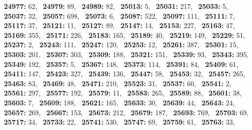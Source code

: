 \textbf{24977:} 62,\allowbreak~ 
\textbf{24979:} 89,\allowbreak~ 
\textbf{24989:} 82,\allowbreak~ 
\textbf{25013:} 5,\allowbreak~ 
\textbf{25031:} 217,\allowbreak~ 
\textbf{25033:} 5,\allowbreak~ 
\textbf{25037:} 32,\allowbreak~ 
\textbf{25057:} 698,\allowbreak~ 
\textbf{25073:} 6,\allowbreak~ 
\textbf{25087:} 522,\allowbreak~ 
\textbf{25097:} 111,\allowbreak~ 
\textbf{25111:} 7,\allowbreak~ 
\textbf{25117:} 37,\allowbreak~ 
\textbf{25121:} 11,\allowbreak~ 
\textbf{25127:} 89,\allowbreak~ 
\textbf{25147:} 14,\allowbreak~ 
\textbf{25153:} 227,\allowbreak~ 
\textbf{25163:} 47,\allowbreak~ 
\textbf{25169:} 355,\allowbreak~ 
\textbf{25171:} 226,\allowbreak~ 
\textbf{25183:} 165,\allowbreak~ 
\textbf{25189:} 40,\allowbreak~ 
\textbf{25219:} 149,\allowbreak~ 
\textbf{25229:} 51,\allowbreak~ 
\textbf{25237:} 2,\allowbreak~ 
\textbf{25243:} 111,\allowbreak~ 
\textbf{25247:} 120,\allowbreak~ 
\textbf{25253:} 12,\allowbreak~ 
\textbf{25261:} 387,\allowbreak~ 
\textbf{25301:} 15,\allowbreak~ 
\textbf{25303:} 201,\allowbreak~ 
\textbf{25307:} 303,\allowbreak~ 
\textbf{25309:} 188,\allowbreak~ 
\textbf{25321:} 151,\allowbreak~ 
\textbf{25339:} 93,\allowbreak~ 
\textbf{25343:} 395,\allowbreak~ 
\textbf{25349:} 192,\allowbreak~ 
\textbf{25357:} 5,\allowbreak~ 
\textbf{25367:} 148,\allowbreak~ 
\textbf{25373:} 114,\allowbreak~ 
\textbf{25391:} 84,\allowbreak~ 
\textbf{25409:} 61,\allowbreak~ 
\textbf{25411:} 147,\allowbreak~ 
\textbf{25423:} 327,\allowbreak~ 
\textbf{25439:} 136,\allowbreak~ 
\textbf{25447:} 58,\allowbreak~ 
\textbf{25453:} 32,\allowbreak~ 
\textbf{25457:} 265,\allowbreak~ 
\textbf{25463:} 83,\allowbreak~ 
\textbf{25469:} 48,\allowbreak~ 
\textbf{25471:} 210,\allowbreak~ 
\textbf{25523:} 31,\allowbreak~ 
\textbf{25537:} 60,\allowbreak~ 
\textbf{25541:} 2,\allowbreak~ 
\textbf{25561:} 297,\allowbreak~ 
\textbf{25577:} 192,\allowbreak~ 
\textbf{25579:} 11,\allowbreak~ 
\textbf{25583:} 265,\allowbreak~ 
\textbf{25589:} 88,\allowbreak~ 
\textbf{25601:} 38,\allowbreak~ 
\textbf{25603:} 7,\allowbreak~ 
\textbf{25609:} 188,\allowbreak~ 
\textbf{25621:} 165,\allowbreak~ 
\textbf{25633:} 30,\allowbreak~ 
\textbf{25639:} 44,\allowbreak~ 
\textbf{25643:} 24,\allowbreak~ 
\textbf{25657:} 269,\allowbreak~ 
\textbf{25667:} 153,\allowbreak~ 
\textbf{25673:} 212,\allowbreak~ 
\textbf{25679:} 187,\allowbreak~ 
\textbf{25693:} 769,\allowbreak~ 
\textbf{25703:} 69,\allowbreak~ 
\textbf{25717:} 34,\allowbreak~ 
\textbf{25733:} 22,\allowbreak~ 
\textbf{25741:} 530,\allowbreak~ 
\textbf{25747:} 69,\allowbreak~ 
\textbf{25759:} 61,\allowbreak~ 
\textbf{25763:} 33,\allowbreak~ 
